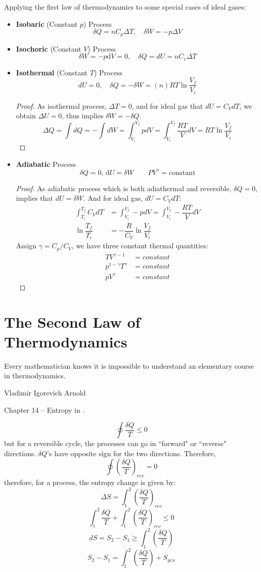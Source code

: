 \documentclass[UTF8]{book}
\newenvironment{theorem}[2][Theorem]{\begin{trivlist}
\item[\hskip \labelsep {\bfseries #1}\hskip \labelsep {\bfseries }]}{\end{trivlist}}
\begin{document}
{Applying the first law of thermodynamics to some special cases 
of ideal gases:}
\begin{itemize}
\item  {\textbf{Isobaric} (Constant $p$) Process}
$$\delta Q=nC_p\Delta T, \quad \delta W=-p\Delta V $$
\item  {\textbf{Isochoric} (Constant $V$) Process}
$$\delta W=-p \mathrm{d}V=0, \quad \delta Q=dU=nC_v\Delta T$$
\item  {\textbf{Isothermal} (Constant $T$) Process}
$$dU=0,\quad \delta Q=-\delta W=(n)RT\ln \dfrac{V_f}{V_i}$$
\begin{proof}
{As isothermal process, $\Delta T=0$, and for ideal gas that $dU=C_VdT$, we obtain $\Delta U=0$, thus implies $\delta W=-\delta Q$.}
$$\Delta Q = \int dQ =-\int dW=\int_{V_i}^{V_f}p d V=\int_{V_i}^{V_f}\dfrac{RT}{V}dV=RT\ln \dfrac{V_f}{V_i}$$
\end{proof}
\item  {\textbf{Adiabatic} Process}
$$\delta Q=0, \,  \mathrm{d} U= \delta W  \qquad PV^{\gamma}=\mathrm{constant}$$
\begin{proof}
{As adiabatic process which is both adiathermal and reversible, $\delta Q=0$, implies that $dU=\delta W$. And for ideal gas, $dU=C_VdT$:}
\begin{align*}
\int_{T_i}^{T_f}C_VdT&=\int_{V_i}^{V_f}-pdV=\int_{V_i}^{V_f}-\dfrac{RT}{V}dV\\
\ln \dfrac{T_f}{T_i}&=-\dfrac{R}{C_V}\ln \dfrac{V_f}{V_i}
\end{align*}
 {Assign $\gamma=C_p/C_V$, we have three constant thermal quantities:}
\begin{align*}
TV^{\gamma -1}&= {constant}\\
p^{1-\gamma}T^{\gamma}&= {constant}\\
pV^{\gamma}&= {constant}
\end{align*}
\end{proof}
\end{itemize}

\section{The Second Law of Thermodynamics}
\epigraph{Every mathematician knows it is impossible to understand an elementary course in thermodynamics.}{Vladimir Igorevich Arnold}
Chapter 14 -- Entropy in \cite{blundell-concepts}.

\begin{theorem}[Clausius Inequality]
{For all thermodynamic cycles, reversible or irreversible, the Clausius inequality is valid:}
$$\oint \dfrac{\delta Q}{T}\leq 0$$
 {but for a reversible cycle, the processes can go in ``forward" or ``reverse" directions. $\delta Q$'s have opposite sign for the two directions. Therefore,}
$$\oint \left(\dfrac{\delta Q}{T}\right)_{rev}=0$$
 {therefore, for a process, the entropy change is given by: }
$$\Delta S=\int_{1}^{2}\left(\dfrac{\delta Q}{T}\right)_{rev}$$
$$\int_{1}^{2}\dfrac{\delta Q}{T}+\int_{1}^{2}\left(\dfrac{\delta Q}{T}\right)_{rev}\leq 0$$
$$dS=S_2-S_1\geq \int_{1}^{2}\left(\dfrac{\delta Q}{T}\right)$$
$$S_2-S_1=\int_{1}^{2}\left(\dfrac{\delta Q}{T}\right)+S_{gen}$$
\end{theorem}
\end{document}
